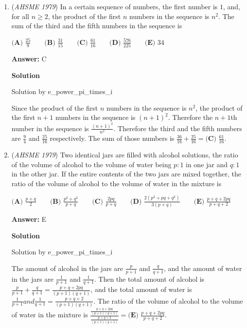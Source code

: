 \begin{enumerate}
 


	\item (\textit{AHSME 1979}) In a certain sequence of numbers, the first number is $1$, and, for all $n\ge 2$, the product of the first $n$ numbers in the sequence is $n^2$. 
The sum of the third and the fifth numbers in the sequence is


 $\textbf{(A) }\frac{25}{9}\qquad \textbf{(B) }\frac{31}{15}\qquad \textbf{(C) }\frac{61}{16}\qquad \textbf{(D) }\frac{576}{225}\qquad \textbf{(E) }34$

 \textbf{Answer: }C



\textbf{Solution}

Solution by e\_power\_pi\_times\_i

 Since the product of the first $n$ numbers in the sequence is $n^2$, the product of the first $n+1$ numbers in the sequence is $(n+1)^2$. Therefore the $n+1$th number in the sequence is $\frac{(n+1)^2}{n^2}$. Therefore the third and the fifth numbers are $\frac{9}{4}$ and $\frac{25}{16}$ respectively. The sum of those numbers is $\frac{36}{16}+\frac{25}{16} = \boxed{\textbf{(C) } \frac{61}{16}}$.

 


	\item (\textit{AHSME 1979}) Two identical jars are filled with alcohol solutions, the ratio of the volume of alcohol to the volume of water being $p : 1$ 
in one jar and $q : 1$ in the other jar. If the entire contents of the two jars are mixed together, 
the ratio of the volume of alcohol to the volume of water in the mixture is


 $\textbf{(A) }\frac{p+q}{2}\qquad \textbf{(B) }\frac{p^2+q^2}{p+q}\qquad \textbf{(C) }\frac{2pq}{p+q}\qquad \textbf{(D) }\frac{2(p^2+pq+q^2)}{3(p+q)}\qquad \textbf{(E) }\frac{p+q+2pq}{p+q+2}$

 \textbf{Answer: }E



\textbf{Solution}

Solution by e\_power\_pi\_times\_i

 The amount of alcohol in the jars are $\frac{p}{p+1}$ and $\frac{q}{q+1}$, and the amount of water in the jars are $\frac{1}{p+1}$ and $\frac{1}{q+1}$. Then the total amount of alcohol is $\frac{p}{p+1} + \frac{q}{q+1} = \frac{p+q+2pq}{(p+1)(q+1)}$, and the total amount of water is $\frac{1}{p+1} and \frac{1}{q+1} = \frac{p+q+2}{(p+1)(q+1)}$. The ratio of the volume of alcohol to the volume of water in the mixture is $\frac{\frac{p+q+2pq}{(p+1)(q+1)}}{\frac{p+q+2}{(p+1)(q+1)}} = \boxed{\textbf{(E) } \frac{p+q+2pq}{p+q+2}}$.


\end{enumerate}

